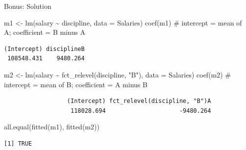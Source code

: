\documentclass[
  ignorenonframetext,
  aspectratio=169,
]{beamer}
\newenvironment{Shaded}{\begin{snugshade}}{\end{snugshade}}
\newcommand{\AttributeTok}[1]{\textcolor[rgb]{0.40,0.45,0.13}{#1}}
\newcommand{\CommentTok}[1]{\textcolor[rgb]{0.37,0.37,0.37}{#1}}
\newcommand{\FunctionTok}[1]{\textcolor[rgb]{0.28,0.35,0.67}{#1}}
\newcommand{\NormalTok}[1]{\textcolor[rgb]{0.00,0.23,0.31}{#1}}
\newcommand{\OtherTok}[1]{\textcolor[rgb]{0.00,0.23,0.31}{#1}}
\newcommand{\SpecialCharTok}[1]{\textcolor[rgb]{0.37,0.37,0.37}{#1}}
\newcommand{\StringTok}[1]{\textcolor[rgb]{0.13,0.47,0.30}{#1}}
\begin{document}
\begin{frame}[fragile]{Bonus: Solution}
\protect\hypertarget{bonus-solution}{}
\begin{Shaded}
\begin{Highlighting}[]
\NormalTok{m1 }\OtherTok{\textless{}{-}} \FunctionTok{lm}\NormalTok{(salary }\SpecialCharTok{\textasciitilde{}}\NormalTok{ discipline, }\AttributeTok{data =}\NormalTok{ Salaries)}
\FunctionTok{coef}\NormalTok{(m1)    }\CommentTok{\# intercept = mean of A; coefficient = B minus A}
\end{Highlighting}
\end{Shaded}

\begingroup\tiny\color{darkgray}

\begin{verbatim}
(Intercept) disciplineB 
 108548.431    9480.264 
\end{verbatim}

\endgroup

\begin{Shaded}
\begin{Highlighting}[]
\NormalTok{m2 }\OtherTok{\textless{}{-}} \FunctionTok{lm}\NormalTok{(salary }\SpecialCharTok{\textasciitilde{}} \FunctionTok{fct\_relevel}\NormalTok{(discipline, }\StringTok{"B"}\NormalTok{), }\AttributeTok{data =}\NormalTok{ Salaries)}
\FunctionTok{coef}\NormalTok{(m2)    }\CommentTok{\# intercept = mean of B; coefficient = A minus B}
\end{Highlighting}
\end{Shaded}

\begingroup\tiny\color{darkgray}

\begin{verbatim}
                  (Intercept) fct_relevel(discipline, "B")A 
                   118028.694                     -9480.264 
\end{verbatim}

\endgroup

\begin{Shaded}
\begin{Highlighting}[]
\FunctionTok{all.equal}\NormalTok{(}\FunctionTok{fitted}\NormalTok{(m1), }\FunctionTok{fitted}\NormalTok{(m2))}
\end{Highlighting}
\end{Shaded}

\begingroup\tiny\color{darkgray}

\begin{verbatim}
[1] TRUE
\end{verbatim}


\end{frame}
\end{document}
